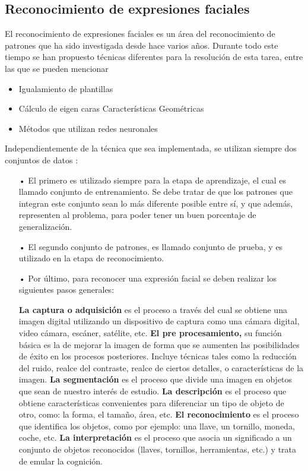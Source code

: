 \vskip 5cm

\subsection{Reconocimiento de expresiones faciales}

El reconocimiento de expresiones faciales es un área del reconocimiento de patrones que ha sido investigada desde hace varios años. Durante todo este tiempo se han propuesto técnicas diferentes para la resolución de esta tarea, entre las que se pueden mencionar \citep{Rafael}

\begin{itemize}
\item Igualamiento de plantillas
\item Cálculo de eigen caras Características Geométricas
\item Métodos que utilizan redes neuronales
\end{itemize}

Independientemente de la técnica que sea implementada, se utilizan siempre dos conjuntos de datos \citep{Santos}:

\begin{itemize}
\item[•] El primero es utilizado siempre para la etapa de aprendizaje, el cual es llamado conjunto de entrenamiento. Se debe tratar de que los patrones que integran este conjunto sean lo más diferente posible entre sí, y que además, representen al problema, para poder tener un buen porcentaje de generalización.
\item[•] El segundo conjunto de patrones, es llamado conjunto de prueba, y es utilizado en la etapa de reconocimiento.
\item[•] Por último, para reconocer una expresión facial se deben realizar los siguientes pasos generales: \vskip 0.1cm

{\bf La captura o adquisición} es el proceso a través del cual se obtiene una imagen digital utilizando un dispositivo de captura como una cámara digital, video cámara, escáner, satélite, etc.
\vskip 0.1cm
{\bf El pre procesamiento,} su función básica es la de mejorar la imagen de forma que se aumenten las posibilidades de éxito en los procesos posteriores. Incluye técnicas tales como la reducción del ruido, realce del contraste, realce de ciertos detalles, o características de la imagen. 
\vskip 0.1cm
{\bf La segmentación} es el proceso que divide una imagen en objetos que sean de nuestro interés de estudio. 
\vskip 0.1cm
{\bf La descripción} es el proceso que obtiene características convenientes para diferenciar un tipo de objeto de otro, como: la forma, el tamaño, área, etc.
\vskip 0.1cm
{\bf El reconocimiento} es el proceso que identifica los objetos, como por ejemplo: una llave, un tornillo, moneda, coche, etc.
\vskip 0.1cm
{\bf La interpretación} es el proceso que asocia un significado a un conjunto de objetos reconocidos (llaves, tornillos, herramientas, etc.) y trata de emular la cognición.

\end{itemize}

